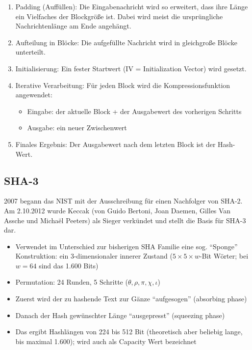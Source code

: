 \begin{enumerate}
    \item Padding (Auffüllen): Die Eingabenachricht wird so erweitert, dass ihre Länge ein Vielfaches der Blockgröße ist. Dabei wird meist die ursprüngliche 
    Nachrichtenlänge am Ende angehängt.
    \item Aufteilung in Blöcke: Die aufgefüllte Nachricht wird in gleichgroße Blöcke unterteilt.
    \item Initialisierung: Ein fester Startwert (IV = Initialization Vector) wird gesetzt.
    \item Iterative Verarbeitung: Für jeden Block wird die Kompressionsfunktion angewendet:
    \begin{itemize}
        \item Eingabe: der aktuelle Block + der Ausgabewert des vorherigen Schritts
        \item Ausgabe: ein neuer Zwischenwert
    \end{itemize}
    \item Finales Ergebnis: Der Ausgabewert nach dem letzten Block ist der Hash-Wert.
\end{enumerate}

\subsection{SHA-3}

2007 begann das NIST mit der Ausschreibung für einen Nachfolger von SHA-2. Am 2.10.2012 wurde Keccak (von Guido
Bertoni, Joan Daemen, Gilles Van Assche und Michaël Peeters) als Sieger verkündet und stellt die Basis für SHA-3 dar.

\begin{itemize}
    \item Verwendet im Unterschied zur bisherigen SHA Familie eine sog. ``Sponge'' Konstruktion: ein 3-dimensionaler innerer Zustand 
    ($5\times 5\times w$-Bit Wörter; 
    bei $w =64$ sind das 1.600 Bits)
    \item Permutation: 24 Runden, 5 Schritte ($\theta, \rho, \pi, \chi, \iota$)
    \item Zuerst wird der zu hashende Text zur Gänze ``aufgesogen'' (absorbing phase)
    \item Danach der Hash gewünschter Länge ``ausgepresst'' (squeezing phase)
    \item Das ergibt Hashlängen von 224 bis 512 Bit (theoretisch aber beliebig lange, bis maximal 1.600); wird auch als Capacity Wert bezeichnet
\end{itemize}

